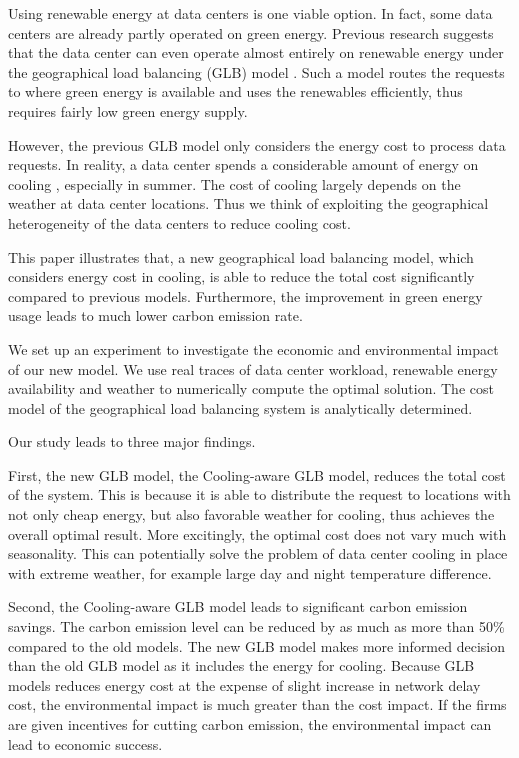 \documentclass{acm_proc_article-sp}
\begin{document}
Using renewable energy at data centers is one viable option. In fact, some data centers are already partly operated on green energy. Previous research suggests that the data center can even operate almost entirely on renewable energy under the geographical load balancing (GLB) model \cite{adam:GLB}. Such a model routes the requests to where green energy is available and uses the renewables efficiently, thus requires fairly low green energy supply. 

However, the previous GLB model only considers the energy cost to process data requests. In reality, a data center spends a considerable amount of energy on cooling \cite{datacenter}, especially in summer. The cost of cooling largely depends on the weather at data center locations. Thus we think of exploiting the geographical heterogeneity of the data centers to reduce cooling cost.

This paper illustrates that, a new geographical load balancing model, which considers energy cost in cooling, is able to reduce the total cost significantly compared to previous models. Furthermore, the improvement in green energy usage leads to much lower carbon emission rate.

We set up an experiment to investigate the economic and environmental impact of our new model. We use real traces of data center workload, renewable energy availability and weather to numerically compute the optimal solution. The cost model of the geographical load balancing system is analytically determined. 

Our study leads to three major findings.

First, the new GLB model, the Cooling-aware GLB model, reduces the total cost of the system. This is because it is able to distribute the request to locations with not only cheap energy, but also favorable weather for cooling, thus achieves the overall optimal result. More excitingly, the optimal cost does not vary much with seasonality. This can potentially solve the problem of data center cooling in place with extreme weather, for example large day and night temperature difference.  

Second, the Cooling-aware GLB model leads to significant carbon emission savings. The carbon emission level can be reduced by as much as more than 50\% compared to the old models. The new GLB model makes more informed decision than the old GLB model as it includes the energy for cooling. Because GLB models reduces energy cost at the expense of slight increase in network delay cost, the environmental impact is much greater than the cost impact. If the firms are given incentives for cutting carbon emission, the environmental impact can lead to economic success.  
\end{document}
